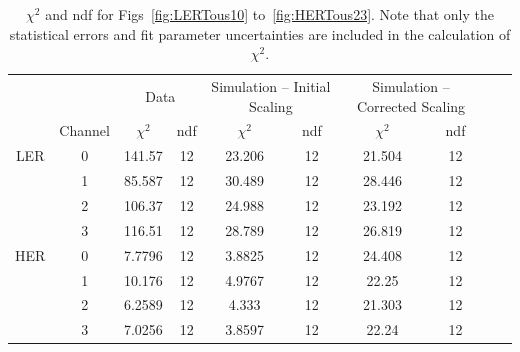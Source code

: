 \begin{table}
    \centering
    \begin{tabular}{cc|cc|cc|cccc}
	&		&	 \multicolumn{2}{c}{Data}			&	 \multicolumn{2}{c}{Simulation – Initial Scaling} 			&	 \multicolumn{2}{c}{Simulation – Corrected Scaling}  			\\	
	&	Channel 	&	$\chi^2$	&	ndf	&	$\chi^2$	&	ndf	&	$\chi^2$	&	ndf	\\	\hline \hline
LER	&	 0	&	141.57	&	12	&	23.206	&	12	&	21.504	&	12	\\	
	&	 1	&	85.587	&	12	&	30.489	&	12	&	28.446	&	12	\\	
	&	 2	&	106.37	&	12	&	24.988	&	12	&	23.192	&	12	\\	
	&	 3	&	116.51	&	12	&	28.789	&	12	&	26.819	&	12	\\	\hline
HER	&	0	&	7.7796	&	12	&	3.8825	&	12	&	24.408	&	12	\\	
	&	1	&	10.176	&	12	&	4.9767	&	12	&	22.25	&	12	\\	
	&	2	&	6.2589	&	12	&	4.333	&	12	&	21.303	&	12	\\	
	&	3	&	7.0256	&	12	&	3.8597	&	12	&	22.24	&	12	\\	\hline
    \end{tabular}
    \caption[$\chi^2$ and ndf for Figs~\ref{fig:LERTous10} to~\ref{fig:HERTous23}]{$\chi^2$ and ndf for Figs~\ref{fig:LERTous10} to~\ref{fig:HERTous23}. Note that only the statistical errors and fit parameter uncertainties are included in the calculation of $\chi^2$.}
    \label{tab:ChiNDF}
\end{table}



